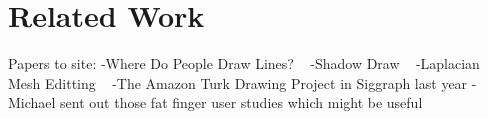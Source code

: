 \section{Related Work}

Papers to site:
-Where Do People Draw Lines? ~\cite{Cole:2008:WDP}
-Shadow Draw ~\cite{Lee:2011}
-Laplacian Mesh Editting ~\cite{Sorkine:2004:LSE}
-The Amazon Turk Drawing Project in Siggraph last year 
-Michael sent out those fat finger user studies which might be useful


